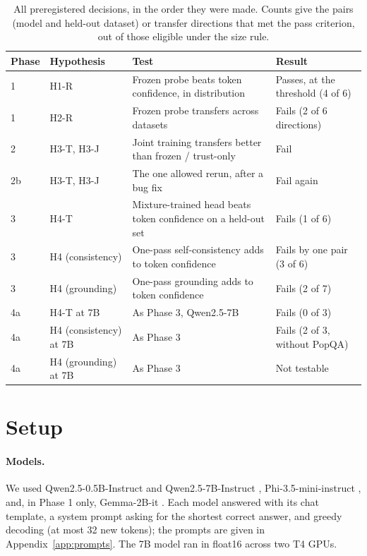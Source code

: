 \documentclass[10pt]{article}
\begin{document}
\begin{table}[t]
\centering
\small
\begin{tabular}{@{}l >{\raggedright\arraybackslash}p{3.3cm} >{\raggedright\arraybackslash}p{5.7cm} >{\raggedright\arraybackslash}p{4.0cm}@{}}
\toprule
Phase & Hypothesis & Test & Result \\
\midrule
1 & H1-R & Frozen probe beats token confidence, in distribution & Passes, at the threshold (4 of 6) \\
1 & H2-R & Frozen probe transfers across datasets & Fails (2 of 6 directions) \\
2 & H3-T, H3-J & Joint training transfers better than frozen / trust-only & Fail \\
2b & H3-T, H3-J & The one allowed rerun, after a bug fix & Fail again \\
3 & H4-T & Mixture-trained head beats token confidence on a held-out set & Fails (1 of 6) \\
3 & H4 (consistency) & One-pass self-consistency adds to token confidence & Fails by one pair (3 of 6) \\
3 & H4 (grounding) & One-pass grounding adds to token confidence & Fails (2 of 7) \\
4a & H4-T at 7B & As Phase 3, Qwen2.5-7B & Fails (0 of 3) \\
4a & H4 (consistency) at 7B & As Phase 3 & Fails (2 of 3, without PopQA) \\
4a & H4 (grounding) at 7B & As Phase 3 & Not testable \\
\bottomrule
\end{tabular}
\caption{All preregistered decisions, in the order they were made. Counts give the pairs (model and held-out dataset) or transfer directions that met the pass criterion, out of those eligible under the size rule.}
\label{tab:program}
\end{table}

\section{Setup}
\label{sec:setup}

\paragraph{Models.} We used Qwen2.5-0.5B-Instruct and Qwen2.5-7B-Instruct \citep{qwen2024qwen25}, Phi-3.5-mini-instruct \citep{abdin2024phi3}, and, in Phase 1 only, Gemma-2B-it \citep{gemma2024}. Each model answered with its chat template, a system prompt asking for the shortest correct answer, and greedy decoding (at most 32 new tokens); the prompts are given in Appendix~\ref{app:prompts}. The 7B model ran in float16 across two T4 GPUs.
\end{document}
